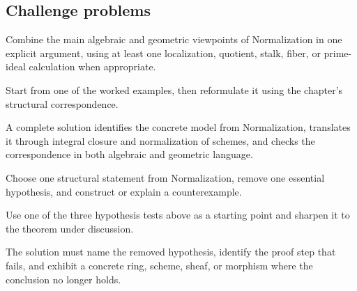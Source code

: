 \subsection*{Challenge problems}

\begin{exercise}\label{exr:vi28-expand-15}
Combine the main algebraic and geometric viewpoints of Normalization in one explicit argument, using at least one localization, quotient, stalk, fiber, or prime-ideal calculation when appropriate.
\end{exercise}
\begin{hint}
Start from one of the worked examples, then reformulate it using the chapter's structural correspondence.
\end{hint}
\begin{solution}
A complete solution identifies the concrete model from Normalization, translates it through integral closure and normalization of schemes, and checks the correspondence in both algebraic and geometric language.
\end{solution}

\begin{exercise}\label{exr:vi28-expand-16}
Choose one structural statement from Normalization, remove one essential hypothesis, and construct or explain a counterexample.
\end{exercise}
\begin{hint}
Use one of the three hypothesis tests above as a starting point and sharpen it to the theorem under discussion.
\end{hint}
\begin{solution}
The solution must name the removed hypothesis, identify the proof step that fails, and exhibit a concrete ring, scheme, sheaf, or morphism where the conclusion no longer holds.
\end{solution}


